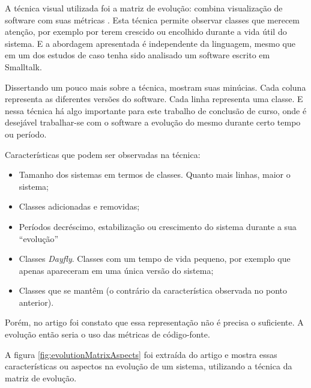 A técnica visual utilizada foi a matriz de evolução: combina visualização de
software com suas métricas \cite{lanza2001evolution}. Esta técnica permite
observar classes que merecem atenção, por exemplo por terem crescido ou
encolhido durante a vida útil do sistema. E a abordagem apresentada é
independente da linguagem, mesmo que em um dos estudos de caso tenha sido
analisado um software escrito em Smalltalk.

Dissertando um pouco mais sobre a técnica, 
mostram suas minúcias. Cada coluna representa as diferentes versões do
software. Cada linha representa uma classe. E nessa técnica há algo importante
para este trabalho de conclusão de curso, onde é desejável trabalhar-se com o
software a evolução do mesmo durante certo tempo ou período.

Características que podem ser observadas na técnica:

\begin{itemize}
  \item Tamanho dos sistemas em termos de classes. Quanto mais linhas, maior o
  sistema;
  \item Classes adicionadas e removidas;
  \item Períodos decréscimo, estabilização ou crescimento do sistema durante a
  sua ``evolução''
  \item Classes \textit{Dayfly}. Classes com um tempo de vida pequeno, por
  exemplo que apenas apareceram em uma única versão do sistema;
  \item Classes que se mantêm (o contrário da característica observada no ponto
  anterior).
\end{itemize}

Porém, no artigo foi constato que essa representação não é precisa o suficiente.
A evolução então seria o uso das métricas de código-fonte.

A figura \ref{fig:evolutionMatrixAspects} foi extraída do artigo e mostra essas
características ou aspectos na evolução de um sistema, utilizando a técnica da
matriz de evolução. 

